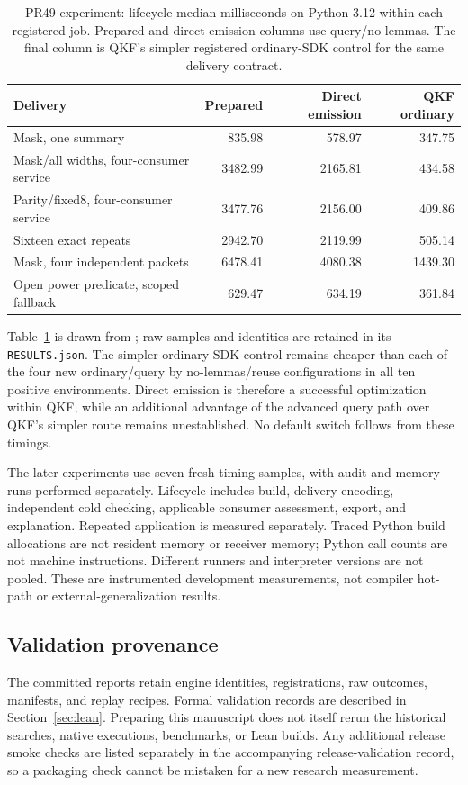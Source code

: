 \begin{table}[htbp]\small
\begin{tabularx}{\textwidth}{@{}Xrrr@{}}
\toprule
Delivery & Prepared & Direct emission & QKF ordinary\\
\midrule
Mask, one summary & 835.98 & 578.97 & 347.75\\
Mask/all widths, four-consumer service & 3482.99 & 2165.81 & 434.58\\
Parity/fixed8, four-consumer service & 3477.76 & 2156.00 & 409.86\\
Sixteen exact repeats & 2942.70 & 2119.99 & 505.14\\
Mask, four independent packets & 6478.41 & 4080.38 & 1439.30\\
Open power predicate, scoped fallback & 629.47 & 634.19 & 361.84\\
\bottomrule
\end{tabularx}
\caption{PR49 experiment: lifecycle median milliseconds on Python 3.12 within each registered job. Prepared and direct-emission columns use query/no-lemmas. The final column is QKF's simpler registered ordinary-SDK control for the same delivery contract.}\label{tab:lifecycle}
\end{table}

Table~\ref{tab:lifecycle} is drawn from ; raw samples and identities are retained in its \texttt{RESULTS.json}. The simpler ordinary-SDK control remains cheaper than each of the four new ordinary/query by no-lemmas/reuse configurations in all ten positive environments. Direct emission is therefore a successful optimization within QKF, while an additional advantage of the advanced query path over QKF's simpler route remains unestablished. No default switch follows from these timings.

The later experiments use seven fresh timing samples, with audit and memory runs performed separately. Lifecycle includes build, delivery encoding, independent cold checking, applicable consumer assessment, export, and explanation. Repeated application is measured separately. Traced Python build allocations are not resident memory or receiver memory; Python call counts are not machine instructions. Different runners and interpreter versions are not pooled. These are instrumented development measurements, not compiler hot-path or external-generalization results.

\subsection{Validation provenance}
The committed reports retain engine identities, registrations, raw outcomes, manifests, and replay recipes. Formal validation records are described in Section~\ref{sec:lean}. Preparing this manuscript does not itself rerun the historical searches, native executions, benchmarks, or Lean builds. Any additional release smoke checks are listed separately in the accompanying release-validation record, so a packaging check cannot be mistaken for a new research measurement.
